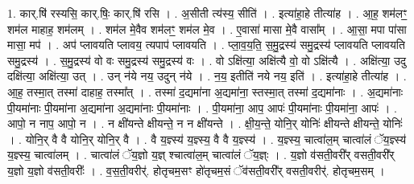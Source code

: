 \documentclass[17pt]{extarticle}
\begin{document}
1. कार्.षि॑ रस्यसि॒ कार्.षिः॒ कार्.षि॑ रसि । . अ॒सीती त्य॑स्य॒ सीति॑ । . इत्या॑हा॒हे तीत्या॑ह । . आ॒ह॒ शम॑लꣳ॒॒ शम॑ल माहाह॒ शम॑लम् । . शम॑ल मे॒वैव शम॑लꣳ॒॒ शम॑ल मे॒व । . ए॒वासा॑ मासा मे॒वै वासा᳚म् । . आ॒सा॒ मपा पा॑सा मासा॒ मप॑ । . अप॑ प्लावयति प्लावय॒ त्यपाप॑ प्लावयति । . प्ला॒व॒य॒ति॒ स॒मु॒द्रस्य॑ समु॒द्रस्य॑ प्लावयति प्लावयति समु॒द्रस्य॑ । . स॒मु॒द्रस्य॑ वो वः समु॒द्रस्य॑ समु॒द्रस्य॑ वः । . वो ऽक्षि॑त्या॒ अक्षि॑त्यै वो॒ वो ऽक्षि॑त्यै । . अक्षि॑त्या॒ उदु दक्षि॑त्या॒ अक्षि॑त्या॒ उत् । . उन् न॑ये नय॒ उदुन् न॑ये । . न॒य॒ इतीति॑ नये नय॒ इति॑ । . इत्या॑हा॒हे तीत्या॑ह । . आ॒ह॒ तस्मा॒त् तस्मा॑ दाहाह॒ तस्मा᳚त् । . तस्मा॑ द॒द्यमा॑ना अ॒द्यमा॑ना॒ स्तस्मा॒त् तस्मा॑ द॒द्यमा॑नाः । . अ॒द्यमा॑नाः पी॒यमा॑नाः पी॒यमा॑ना अ॒द्यमा॑ना अ॒द्यमा॑नाः पी॒यमा॑नाः । . पी॒यमा॑ना॒ आप॒ आपः॑ पी॒यमा॑नाः पी॒यमा॑ना॒ आपः॑ । . आपो॒ न नाप॒ आपो॒ न । . न क्षी॑यन्ते क्षीयन्ते॒ न न क्षी॑यन्ते । . क्षी॒य॒न्ते॒ योनि॒र् योनिः॑ क्षीयन्ते क्षीयन्ते॒ योनिः॑ । . योनि॒र् वै वै योनि॒र् योनि॒र् वै । . वै य॒ज्ञ्स्य॑ य॒ज्ञ्स्य॒ वै वै य॒ज्ञ्स्य॑ । . य॒ज्ञ्स्य॒ चात्वा॑ल॒म् चात्वा॑लं ॅय॒ज्ञ्स्य॑ य॒ज्ञ्स्य॒ चात्वा॑लम् । . चात्वा॑लं ॅय॒ज्ञो य॒ज्ञ् श्चात्वा॑ल॒म् चात्वा॑लं ॅय॒ज्ञ्ः । . य॒ज्ञो व॑सती॒वरी᳚र् वसती॒वरी᳚र् य॒ज्ञो य॒ज्ञो व॑सती॒वरीः᳚ । . व॒स॒ती॒वरीर्॑. होतृचम॒सꣳ हो॑तृचम॒सं ॅव॑सती॒वरी᳚र् वसती॒वरीर्॑. होतृचम॒सम् । \newline
\end{document}
